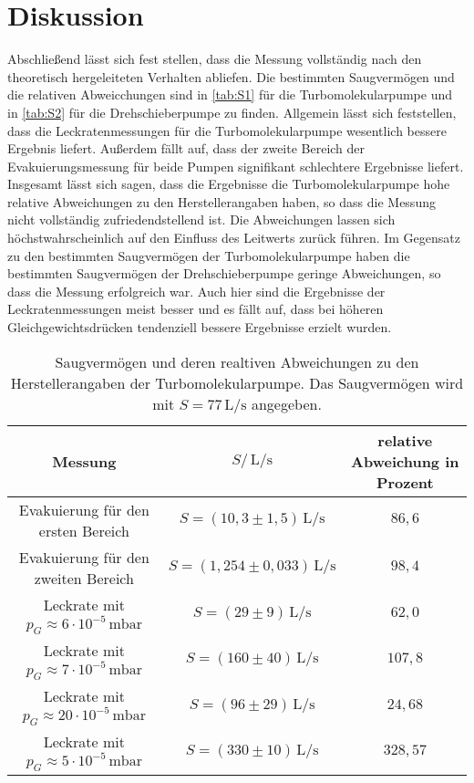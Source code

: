 \section{Diskussion}
\label{sec:Diskussion}
Abschließend lässt sich fest stellen, dass die Messung vollständig nach den theoretisch hergeleiteten Verhalten
abliefen. Die bestimmten Saugvermögen und die relativen Abweicchungen sind in \autoref{tab:S1} für die
Turbomolekularpumpe und in \autoref{tab:S2} für die Drehschieberpumpe zu finden. Allgemein lässt sich feststellen,
dass die Leckratenmessungen für die Turbomolekularpumpe wesentlich bessere Ergebnis liefert.
Außerdem fällt auf, dass der zweite Bereich der Evakuierungsmessung für beide Pumpen signifikant schlechtere
Ergebnisse liefert. Insgesamt lässt sich sagen, dass die Ergebnisse die Turbomolekularpumpe hohe relative
Abweichungen zu den Herstellerangaben haben, so dass die Messung nicht vollständig zufriedendstellend ist.
Die Abweichungen lassen sich höchstwahrscheinlich auf den Einfluss des Leitwerts zurück führen. Im
Gegensatz zu den bestimmten Saugvermögen der Turbomolekularpumpe haben die bestimmten Saugvermögen der
Drehschieberpumpe geringe Abweichungen, so dass die Messung erfolgreich war. Auch hier sind die Ergebnisse der
Leckratenmessungen meist besser und es fällt auf, dass bei höheren Gleichgewichtsdrücken tendenziell bessere
Ergebnisse erzielt wurden. 
\begin{table}
    \centering
    \caption{Saugvermögen und deren realtiven Abweichungen zu den Herstellerangaben der Turbomolekularpumpe. Das
    Saugvermögen wird mit $S=77\,\si{\liter\per\second}$ angegeben.}
    \label{tab:S1}
    \begin{tabular}{c c c}
        \toprule
        Messung & $S/\,\si{\liter\per\second}$ & relative Abweichung in Prozent \\
        \midrule
        Evakuierung für den ersten Bereich & $S = (10,3 \pm 1,5)\,\si{\liter\per\second}$ & $86,6$ \\
        Evakuierung für den zweiten Bereich & $S =(1,254 \pm 0,033)\,\si{\liter\per\second}$ & $98,4 $ \\
        Leckrate mit $p_G \approx  6 \cdot 10^{-5} \,\si{\milli\bar}$ & $S = (29 \pm 9)\,\si{\liter\per\second}$ & $62,0$\\
        Leckrate mit $p_G \approx  7 \cdot 10^{-5} \,\si{\milli\bar}$ & $S = (160 \pm 40)\,\si{\liter\per\second}$ & $107,8$\\
        Leckrate mit $p_G \approx 20 \cdot 10^{-5} \,\si{\milli\bar}$ & $S = (96 \pm 29)\,\si{\liter\per\second}$ & $24,68$\\
        Leckrate mit $p_G \approx  5 \cdot 10^{-5} \,\si{\milli\bar}$ & $S = (330 \pm 10)\,\si{\liter\per\second}$ & $328,57$\\
        \bottomrule
    \end{tabular}
\end{table}

